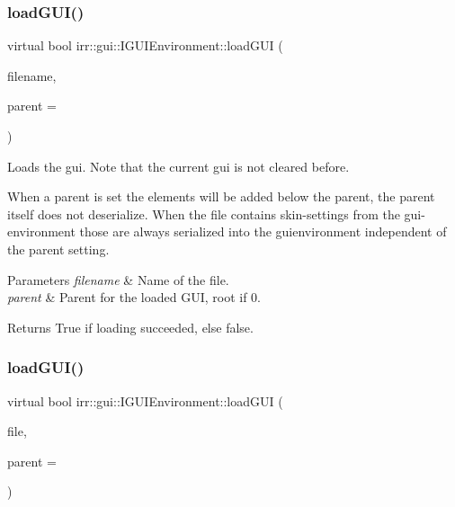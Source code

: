\subsubsection{\texorpdfstring{load\+G\+U\+I()}{loadGUI()}\hspace{0.1cm}{\footnotesize\ttfamily [1/2]}}
{\footnotesize\ttfamily virtual bool irr\+::gui\+::\+I\+G\+U\+I\+Environment\+::load\+G\+UI (\begin{DoxyParamCaption}\item[{const \hyperlink{namespaceirr_1_1io_ab1bdc45edb3f94d8319c02bc0f840ee1}{io\+::path} \&}]{filename,  }\item[{\hyperlink{classirr_1_1gui_1_1IGUIElement}{I\+G\+U\+I\+Element} $\ast$}]{parent = {} }\end{DoxyParamCaption})\hspace{0.3cm}{\ttfamily [pure virtual]}}



Loads the gui. Note that the current gui is not cleared before. 

When a parent is set the elements will be added below the parent, the parent itself does not deserialize. When the file contains skin-\/settings from the gui-\/environment those are always serialized into the guienvironment independent of the parent setting. 
\begin{DoxyParams}{Parameters}
{\em filename} & Name of the file. \\
\hline
{\em parent} & Parent for the loaded G\+UI, root if 0. \\
\hline
\end{DoxyParams}
\begin{DoxyReturn}{Returns}
True if loading succeeded, else false. 
\end{DoxyReturn}
\mbox{\label{classirr_1_1gui_1_1IGUIEnvironment_a23e53c388d45358c53304d095f0b029b}} 
\subsubsection{\texorpdfstring{load\+G\+U\+I()}{loadGUI()}\hspace{0.1cm}{\footnotesize\ttfamily [2/2]}}
{\footnotesize\ttfamily virtual bool irr\+::gui\+::\+I\+G\+U\+I\+Environment\+::load\+G\+UI (\begin{DoxyParamCaption}\item[{\hyperlink{classirr_1_1io_1_1IReadFile}{io\+::\+I\+Read\+File} $\ast$}]{file,  }\item[{\hyperlink{classirr_1_1gui_1_1IGUIElement}{I\+G\+U\+I\+Element} $\ast$}]{parent = {} }\end{DoxyParamCaption})\hspace{0.3cm}{\ttfamily [pure virtual]}}



